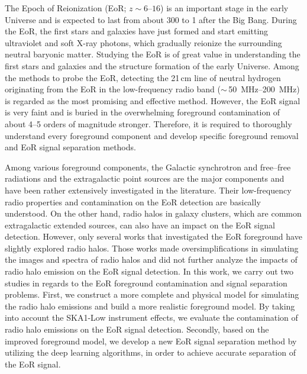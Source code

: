 \begin{englishabstract}

The Epoch of Reionization (EoR; $z \sim \numrange{6}{16}$) is
an important stage in the early Universe and is expected to last
from about \SI{300}{\Myr} to \SI{1}{\Gyr} after the Big Bang.
During the EoR, the first stars and galaxies have just formed and
start emitting ultraviolet and soft X-ray photons,
which gradually reionize the surrounding neutral baryonic matter.
Studying the EoR is of great value in understanding the first stars
and galaxies and the structure formation of  the early Universe.
Among the methods to probe the EoR, detecting the 21\,cm line of
neutral hydrogen originating from the EoR in the low-frequency
radio band ($\sim$\,\SIrange{50}{200}{\MHz}) is regarded as
the most promising and effective method.
However, the EoR signal is very faint and is buried in the overwhelming
foreground contamination of about 4--5 orders of magnitude stronger.
Therefore, it is required to thoroughly understand every foreground
component and develop specific foreground removal and EoR signal
separation methods.

Among various foreground components, the Galactic synchrotron and
free--free radiations and the extragalactic point sources are the
major components and have been rather extensively investigated in
the literature.
Their low-frequency radio properties and contamination on the EoR
detection are basically understood.
On the other hand, radio halos in galaxy clusters, which are common
extragalactic extended sources, can also have an impact on the EoR
signal detection.
However, only several works that investigated the EoR foreground
have slightly explored radio halos.
Those works made oversimplifications in simulating the images and
spectra of radio halos and did not further analyze the impacts of
radio halo emission on the EoR signal detection.
In this work, we carry out two studies in regards to the EoR
foreground contamination and signal separation problems.
First, we construct a more complete and physical model for simulating
the radio halo emissions and build a more realistic foreground model.
By taking into account the SKA1-Low instrument effects, we evaluate
the contamination of radio halo emissions on the EoR signal detection.
Secondly, based on the improved foreground model, we develop a new EoR
signal separation method by utilizing the deep learning algorithms,
in order to achieve accurate separation of the EoR signal.


\end{englishabstract}
